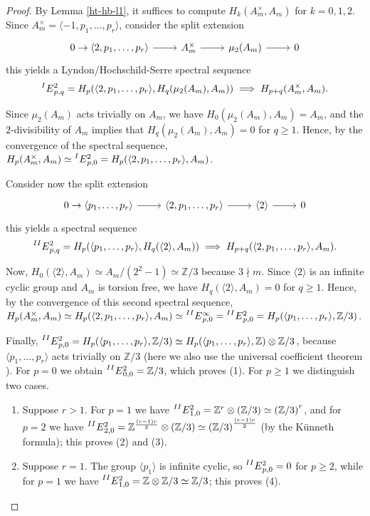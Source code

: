 \documentclass[11pt]{amsart}
\theoremstyle{definition}
\theoremstyle{plain}
\theoremstyle{definition}
\numberwithin{equation}{section}
\newcommand{\z}{\mathbb{Z}}
\newcommand{\lan}{\langle}
\newcommand{\ran}{\rangle}
\begin{document}
	\begin{proof}
		By Lemma \ref{ht-hb-l1}, it suffices to compute $H_{k}(A_m^\times,A_m)$ for $k=0,1,2$. Since $A_m^\times=\lan-1,p_1,\dots,p_r\ran$, consider the split extension
		\[
		\begin{tikzcd}
			0\to \lan 2,p_1,\dots,p_r\ran\ar[r] & A_m^\times \ar[r] & \mu_2(A_m)\ar[r] & 0 
		\end{tikzcd}
		\]
		this yields a Lyndon/Hochschild-Serre spectral sequence
		\[
		\prescript{I}{}{E}^2_{p,q}=H_p(\lan 2,p_1,\dots,p_r\ran,H_q(\mu_2(A_m),A_m))\implies H_{p+q}(A_m^\times,A_m).
		\]
		
		Since $\mu_2(A_m)$ acts trivially on $A_m$, we have $H_0(\mu_2(A_m),A_m)=A_m$, and the $2$-divisibility of $A_m$ implies that $H_q(\mu_2(A_m),A_m)=0$ for $q\geq 1$. Hence, by the convergence of the spectral sequence, $H_p(A_m^\times,A_m)\simeq\prescript{I}{}{E}^2_{p,0}=H_p(\lan 2,p_1,\dots,p_r\ran,A_m)$.
		
		Consider now the split extension
		\[
		\begin{tikzcd}
			0\to \lan p_1,\dots,p_r\ran\ar[r] & \lan2,p_1,\dots,p_r\ran \ar[r] & \lan 2\ran\ar[r] & 0 
		\end{tikzcd}
		\]
		this yields a spectral sequence
		\[
		\prescript{II}{}{E}^2_{p,q}=H_p(\lan p_1,\dots,p_r\ran,H_q(\lan 2\ran,A_m))\implies H_{p+q}(\lan2,p_1,\dots,p_r\ran,A_m).
		\]
		
		Now, $H_0(\lan 2\ran,A_m)\simeq A_m/(2^2-1)\simeq\z/3$ because $3\nmid m$. Since $\lan 2\ran$ is an infinite cyclic group and $A_m$ is torsion free, we have $H_q(\lan 2\ran,A_m)=0$ for $q\geq 1$. Hence, by the convergence of this second spectral sequence, $H_p(A_m^\times,A_m)\simeq H_p(\lan 2,p_1,\dots,p_r\ran,A_m)\simeq\prescript{II}{}{E}^\infty_{p,0}=\prescript{II}{}{E}^2_{p,0}=H_p(\lan p_1,\dots,p_r\ran,\z/3)$.
		
		Finally, $\prescript{II}{}{E}^2_{p,0}=H_p(\lan p_1,\dots,p_r\ran,\z/3)\simeq H_p(\lan p_1,\dots,p_r\ran,\z)\otimes \z/3$, because $\lan p_1,\dots,p_r\ran$ acts trivially on $\z/3$ (here we also use the universal coefficient theorem \cite[III.1, Exercise 3]{brown1994}). For $p=0$ we obtain $\prescript{II}{}{E}^2_{0,0}=\z/3$, which proves (1). For $p\geq 1$ we distinguish two cases.
		\begin{enumerate}
			\item Suppose $r>1$. For $p=1$ we have $\prescript{II}{}{E}^2_{1,0}=\z^r\otimes(\z/3)\simeq\left(\z/3\right)^r$, and for $p=2$ we have $\prescript{II}{}{E}^2_{2,0}=\z^{\frac{(r-1)r}{2}}\otimes(\z/3)\simeq\left(\z/3\right)^{\frac{(r-1)r}{2}}$ (by the K\"unneth formula); this proves (2) and (3).
			\item Suppose $r=1$. The group $\lan p_1\ran$ is infinite cyclic, so $\prescript{II}{}{E}^2_{p,0}=0$ for $p\geq 2$, while for $p=1$ we have $\prescript{II}{}{E}^2_{1,0}=\z\otimes\z/3\simeq\z/3$; this proves (4).
		\end{enumerate}
	\end{proof}
\end{document}

